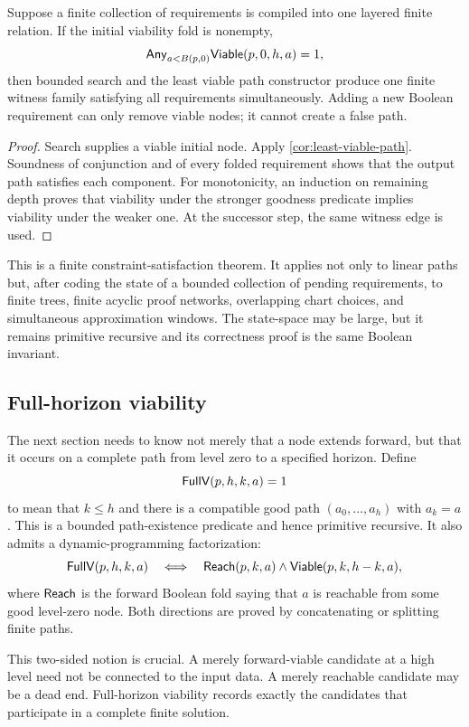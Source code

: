 \begin{theorem}
\label{thm:witness-amalgamation}
Suppose a finite collection of requirements is compiled into one layered
finite relation.  If the initial viability fold is nonempty,
\[
 \mathsf{Any}_{a<B(p,0)}\mathsf{Viable}(p,0,h,a)=1,
\]
then bounded search and the least viable path constructor produce one finite
witness family satisfying all requirements simultaneously.  Adding a new
Boolean requirement can only remove viable nodes; it cannot create a false
path.
\end{theorem}

\begin{proof}
Search supplies a viable initial node.  Apply
\cref{cor:least-viable-path}.  Soundness of conjunction and of every folded
requirement shows that the output path satisfies each component.  For
monotonicity, an induction on remaining depth proves that viability under the
stronger goodness predicate implies viability under the weaker one.  At the
successor step, the same witness edge is used.
\end{proof}

This is a finite constraint-satisfaction theorem.  It applies not only to
linear paths but, after coding the state of a bounded collection of pending
requirements, to finite trees, finite acyclic proof networks, overlapping
chart choices, and simultaneous approximation windows.  The state-space may
be large, but it remains primitive recursive and its correctness proof is the
same Boolean invariant.

\subsection{Full-horizon viability}

The next section needs to know not merely that a node extends forward, but that
it occurs on a complete path from level zero to a specified horizon.  Define
\[
 \mathsf{FullV}(p,h,k,a)=1
\]
to mean that \(k\le h\) and there is a compatible good path
\((a_0,\ldots,a_h)\) with \(a_k=a\).  This is a bounded path-existence
predicate and hence primitive recursive.  It also admits a dynamic-programming
factorization:
\[
 \mathsf{FullV}(p,h,k,a)
 \quad\Longleftrightarrow\quad
 \mathsf{Reach}(p,k,a)\wedge\mathsf{Viable}(p,k,h-k,a),
\]
where \(\mathsf{Reach}\) is the forward Boolean fold saying that \(a\) is reachable
from some good level-zero node.  Both directions are proved by concatenating
or splitting finite paths.

This two-sided notion is crucial.  A merely forward-viable candidate at a high
level need not be connected to the input data.  A merely reachable candidate
may be a dead end.  Full-horizon viability records exactly the candidates that
participate in a complete finite solution.

